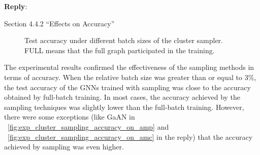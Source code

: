 \documentclass[12pt]{article}
\newenvironment{myquote}[1]%
{\vspace{0.5em}\begin{zitat}{#1}}
{\end{zitat}\vspace{0.5em}}
\newenvironment{reply}
   {\medskip \noindent \textbf{Reply}:\  }
   {\medskip}
\begin{document}
\begin{reply}
\begin{myquote}{Section 4.4.2 ``Effects on Accuracy''}
    \begin{figure}[H]
        \centering
        \caption{Test accuracy under different batch sizes of the cluster sampler. FULL means that the full graph participated in the training.}
        \label{fig:exp_sampling_relative_batch_size_accuracy_cluster}
    \end{figure}
    
    The experimental results confirmed the effectiveness of the sampling methods in terms of accuracy.
    When the relative batch size was greater than or equal to 3\%, the test accuracy of the GNNs trained with sampling was close to the accuracy obtained by full-batch training.
    In most cases, the accuracy achieved by the sampling techniques was slightly lower than the full-batch training.
    However, there were some exceptions (like GaAN in \figurename~\ref{fig:exp_cluster_sampling_accuracy_on_amp} and \figurename~\ref{fig:exp_cluster_sampling_accuracy_on_amc} in the reply) that the accuracy achieved by sampling was even higher.
    

\end{myquote}
\end{reply}
\end{document}
